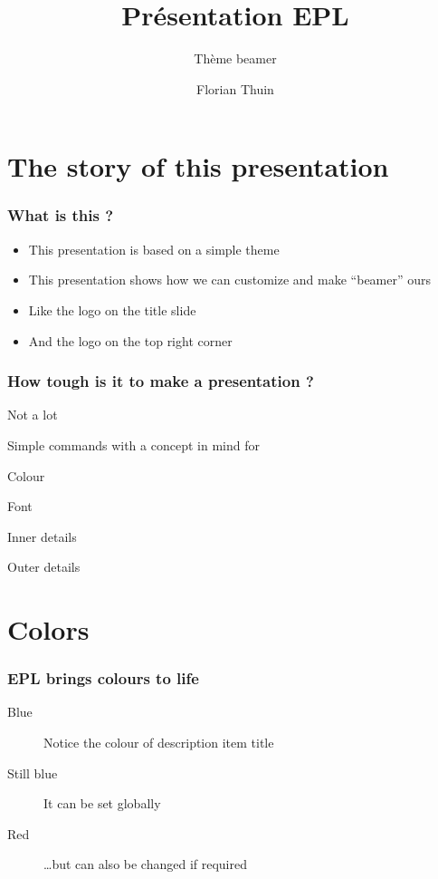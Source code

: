 \documentclass{beamer}
\title{Présentation EPL}
\subtitle{Thème beamer}
\author{Florian Thuin}
\institute{Ecole Polytechnique de Louvain}
\newenvironment{wideitemize}{\itemize\addtolength{\itemsep}{10pt}}{\enditemize}
\begin{document}
\begin{frame}[plain]
	\titlepage
\end{frame}



\section{The story of this presentation}

\begin{frame}
	\frametitle{What is this ?}
		\begin{itemize}
 			\item This presentation is based on a simple theme
 			\item This presentation shows how we can customize and make
                \enquote{beamer} ours
 			\item Like the logo on the title slide
 			\item And the logo on the top right corner
 		\end{itemize}
\end{frame}


\begin{frame}
	\frametitle{How tough is it to make a presentation ?}
		\begin{wideitemize}
			\item Not a lot
			\item Simple commands with a concept in mind for
			\pause
			\item Colour
			\pause
			\item Font
			\pause
			\item Inner details
			\pause
			\item Outer details
		\end{wideitemize}
\end{frame}

\section{Colors}

\begin{frame}
	\frametitle{EPL brings colours to life}
		\begin{description}
			\item [Blue] Notice the colour of description item title
			\item [Still blue] It can be set globally
			\item [\color{red} Red] \dots but can also be changed if required
		\end{description}
\end{frame}	
\end{document}
